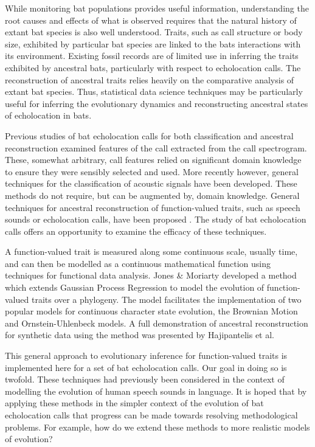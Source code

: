 \documentclass[wsdraft]{ws-rv9x6} %
\begin{document}
While monitoring bat populations provides useful information, understanding the root causes and effects of what is observed requires that the natural history of extant bat species is also well understood. Traits, such as call structure or body size, exhibited by particular bat species are linked to the bats interactions with its environment. \cite{aldridge1987morphology} Existing fossil records are of limited use in inferring the traits exhibited by ancestral bats, particularly with respect to echolocation calls. The reconstruction of ancestral traits relies heavily on the comparative analysis\cite{felsenstein2004inferring} of extant bat species. Thus, statistical data science techniques may be particularly useful for inferring the evolutionary dynamics and reconstructing ancestral states of echolocation in bats.

Previous studies of bat echolocation calls for both classification \cite{walters2012continental} and ancestral reconstruction \cite{collen2012evolution} examined features of the call extracted from the call spectrogram. These, somewhat arbitrary, call features relied on significant domain knowledge to ensure they were sensibly selected and used. More recently however, general techniques for the classification of acoustic signals have been developed. \cite{stathopoulos2014bat} \cite{damoulas2010bayesian} These methods do not require, but can be augmented by, domain knowledge. General techniques for ancestral reconstruction of function-valued traits, such as speech sounds or echolocation calls, have been proposed \cite{group2012phylogenetic}. The study of bat echolocation calls offers an opportunity to examine the efficacy of these techniques.

A function-valued trait is measured along some continuous scale, usually time, and can then be modelled as a continuous mathematical function using techniques for functional data analysis. \cite{ramsay2006functional} Jones \& Moriarty \cite{jones2013evolutionary} developed a method which extends Gaussian Process Regression \cite{rasmussen2006gaussian} to model the evolution of function-valued traits over a phylogeny. The model facilitates the implementation of two popular models for continuous character state evolution,\cite{joy2016ancestral} the Brownian Motion and Ornstein-Uhlenbeck models.\cite{lande1976natural} A full demonstration of ancestral reconstruction for synthetic data using the method was presented by Hajipantelis et al.\cite{hadjipantelis2013function}

This general approach to evolutionary inference for function-valued traits is implemented here for a set of bat echolocation calls. Our goal in doing so is twofold. These techniques had previously been considered in the context of modelling the evolution of human speech sounds in language. \cite{group2012phylogenetic} It is hoped that by applying these methods in the simpler context of the evolution of bat echolocation calls that progress can be made towards resolving methodological problems. For example, how do we extend these methods to more realistic models of evolution?  
\end{document}
